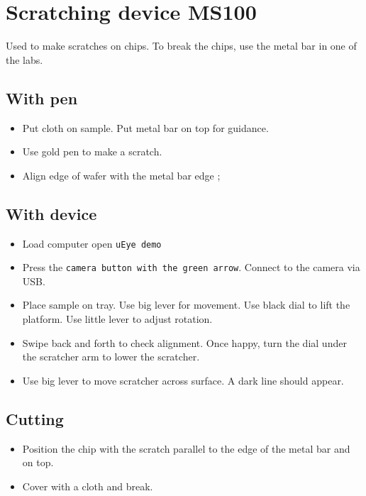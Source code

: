 \section{Scratching device MS100}
  Used to make scratches on chips. To break the chips, use the metal bar in one of the labs. 
  
  \subsection{With pen}
  \begin{itemize}
  	\item Put cloth on sample. Put metal bar on top for guidance.
  	\item Use gold pen to make a scratch.
  	\item Align edge of wafer with the metal bar edge \ra {};
  \end{itemize}

  \subsection{With device}
  \begin{itemize}
  	\item Load computer open \texttt{uEye demo}
  	\item Press the \texttt{camera button with the green arrow}. Connect to the camera via USB.
  	\item Place sample on tray. Use big lever for movement. Use black dial to lift the platform. Use little lever to adjust rotation.
  	\item Swipe back and forth to check alignment. Once happy, turn the dial under the scratcher arm to lower the scratcher.
  	\item Use big lever to move scratcher across surface. A dark line should appear.
  \end{itemize}

  
  \subsection{Cutting}
  \begin{itemize}
  	\item Position the chip with the scratch parallel to the edge of the metal bar and on top.
  	\item Cover with a cloth and break.
  \end{itemize}
 
 
 \newpage
 